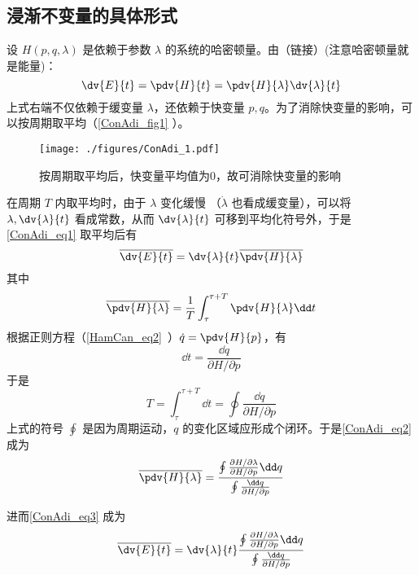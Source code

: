 \subsection{浸渐不变量的具体形式}
设 $H(p,q,\lambda)$ 是依赖于参数 $\lambda$ 的系统的哈密顿量。由（链接）(注意哈密顿量就是能量)：
\begin{equation}\label{ConAdi_eq1}
\dv{E}{t}=\pdv{H}{t}=\pdv{H}{\lambda}\dv{\lambda}{t}
\end{equation}
上式右端不仅依赖于缓变量 $\lambda$，还依赖于快变量 $p,q$。为了消除快变量的影响，可以按周期取平均（\autoref{ConAdi_fig1} ）。
\begin{figure}[ht]
\centering
\texttt{[image: ./figures/ConAdi\_1.pdf]}
\caption{按周期取平均后，快变量平均值为0，故可消除快变量的影响} \label{ConAdi_fig1}
\end{figure}
在周期 $T$ 内取平均时，由于 $\lambda$ 变化缓慢 （$\dot\lambda$ 也看成缓变量），可以将 $\lambda,\dv{\lambda}{t}$ 看成常数，从而 $\dv{\lambda}{t}$ 可移到平均化符号外，于是\autoref{ConAdi_eq1} 取平均后有
\begin{equation}\label{ConAdi_eq3}
\overline{\dv{E}{t}}=\dv{\lambda}{t}\overline{\pdv{H}{\lambda}}
\end{equation}
其中
\begin{equation}\label{ConAdi_eq2}
\overline{\pdv{H}{\lambda}}=\frac{1}{T}\int_\tau^{\tau+T}\pdv{H}{\lambda}\dd t
\end{equation}
根据正则方程（\autoref{HamCan_eq2}~）$\dot q=\pdv{H}{p}$，有
\begin{equation}
\dd t=\frac{\dd q}{\partial{H}/\partial{p}}
\end{equation}
于是
\begin{equation}
T=\int_{\tau}^{\tau+T}\dd t=\oint\frac{\dd q}{\partial{H}/\partial{p}}
\end{equation}
上式的符号 $\oint$ 是因为周期运动，$q$ 的变化区域应形成个闭环。于是\autoref{ConAdi_eq2} 成为
\begin{equation}
\overline{\pdv{H}{\lambda}}=\frac{\oint\frac{\partial{H}/\partial{\lambda}}{\partial{H}/\partial{p}}\dd q}
{\oint\frac{\dd q}{\partial{H}/\partial{p}}}
\end{equation}
 
进而\autoref{ConAdi_eq3} 成为
\begin{equation}\label{ConAdi_eq5}
\overline{\dv{E}{t}}=\dv{\lambda}{t}
\frac{\oint\frac{\partial{H}/\partial{\lambda}}{\partial{H}/\partial{p}}\dd q}
{\oint\frac{\dd q}{\partial{H}/\partial{p}}}
\end{equation}


